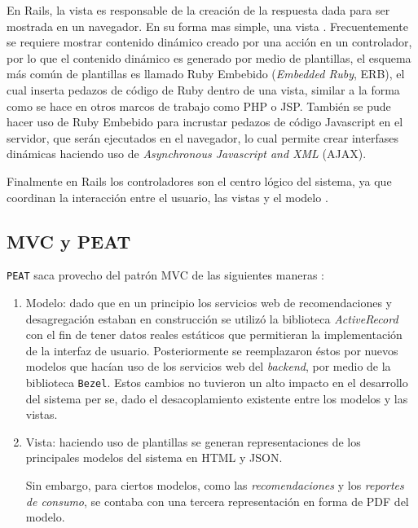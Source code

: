 En Rails, la vista es responsable de la creación de la respuesta dada para
ser mostrada en un navegador. En su forma mas simple, una vista  \cite{15_agile_hansson}.
Frecuentemente se requiere mostrar contenido dinámico creado por una acción en un
controlador, por lo que el contenido dinámico es generado por medio de plantillas,
el esquema más común de plantillas es llamado Ruby Embebido (\textit{Embedded Ruby},
ERB), el cual inserta pedazos de código de Ruby dentro de una vista, similar a la
forma como se hace en otros marcos de trabajo como PHP o JSP. También se pude hacer
uso de Ruby Embebido para incrustar pedazos de código Javascript en el servidor,
que serán ejecutados en el navegador, lo cual permite crear interfases
dinámicas haciendo uso de \textit{Asynchronous Javascript and XML} (AJAX).

Finalmente en Rails los controladores son el centro lógico del sistema, ya que
coordinan la interacción entre el usuario, las vistas y el modelo
\cite{15_agile_hansson}.

\subsection{MVC y PEAT}
\texttt{PEAT} saca provecho del patrón MVC de las siguientes maneras \cite{15_agile_hansson}:

\begin{enumerate}
\item Modelo: dado que en un principio los servicios web de recomendaciones y
  desa\-gregación estaban en construcción se utilizó la biblioteca
  \textit{ActiveRecord} con el fin de tener datos reales estáticos que
  permitieran la implementación de la interfaz de usuario.
  Posteriormente se reemplazaron éstos por nuevos modelos que hacían
  uso de los servicios web del \textit{backend}, por medio de la biblioteca
  \texttt{Bezel}.
  Estos cambios no tuvieron un alto impacto en el desarrollo del sistema per se,
  dado el desacoplamiento existente entre los modelos y las vistas.
\item Vista: haciendo uso de plantillas se generan representaciones de los
  principales modelos del sistema en HTML y JSON.

  Sin embargo, para ciertos modelos, como las \textit{recomendaciones} y los
  \textit{reportes de consumo}, se contaba con una tercera representación en forma
  de PDF del modelo.
\end{enumerate}

